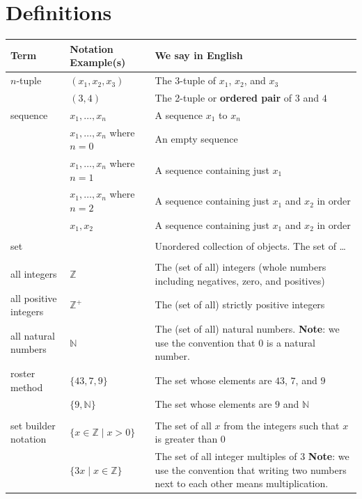 \documentclass[12pt, oneside]{article}
\begin{document}
\begin{flushright}
\end{flushright} \section*{Definitions}


\begin{center}
\begin{tabular}{|llp{9cm}|}
\hline
Term & Notation Example(s) & We say in English \\
\hline
$n$-tuple & $(x_1, x_2, x_3)$ & The 3-tuple of $x_1$, $x_2$, and $x_3$ \\
          & $(3, 4)$ & The 2-tuple or {\bf ordered pair} of $3$ and $4$ \\

sequence & $x_1, \ldots, x_n$ & A sequence $x_1$ to $x_n$ \\
         & $x_1, \ldots, x_n$ where $n = 0$ & An empty sequence \\
         & $x_1, \ldots, x_n$ where $n = 1$ & A sequence containing just $x_1$ \\
         & $x_1, \ldots, x_n$ where $n = 2$ & A sequence containing just $x_1$ and $x_2$ in order \\
         & $x_1, x_2$ & A sequence containing just $x_1$ and $x_2$ in order \\
&&\\
set & & Unordered collection of objects. The set of \ldots \\
&&\\
all integers & $\mathbb{Z}$ & The (set of all) integers (whole numbers including negatives, zero, and positives) \\
all positive integers & $\mathbb{Z}^+$ & The (set of all) strictly positive integers \\
all natural numbers & $\mathbb{N}$ & The (set of all) natural numbers. {\bf Note}: we use the convention that $0$ is a natural number. \\
roster method & $\{43, 7, 9\}$ & The set whose elements are $43$, $7$, and $9$\\
              & $\{9, \mathbb{N}\}$ & The set whose elements are $9$ and $\mathbb{N}$\\

&&\\

set builder notation & $\{ x \in \mathbb{Z} \mid x > 0\}$ & The set of all $x$ from the integers such that $x$ is greater than $0$ \\
                     & $\{ 3x  \mid x \in \mathbb{Z} \}$ & The set of all integer multiples of $3$ {\bf Note}: we use the convention that writing two numbers next to each other means multiplication. \\


\end{tabular}
\end{center}
\end{document}
